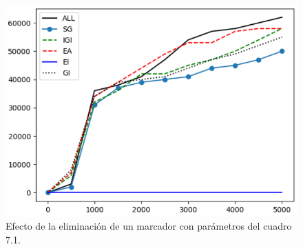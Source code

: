 \begin{figure}[h]
\centering
\includegraphics[scale=0.6]{figures/experiments/exp7/exp7-2}
\caption{Efecto de la eliminación de un marcador con parámetros del cuadro 7.1.}
\end{figure}
